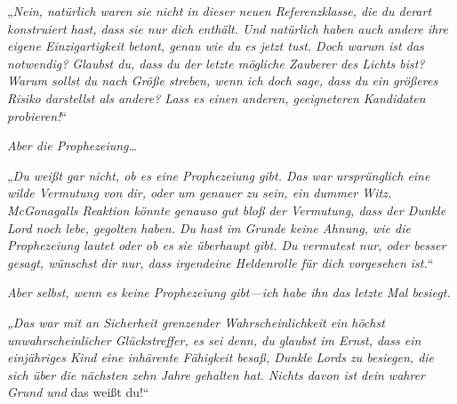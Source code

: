 „\emph{Nein, natürlich waren sie nicht in dieser neuen Referenzklasse, die du derart konstruiert hast, dass sie nur dich enthält. Und natürlich haben auch andere ihre eigene Einzigartigkeit betont, genau wie du es jetzt tust. Doch warum ist das notwendig? Glaubst du, dass du der letzte mögliche Zauberer des Lichts bist? Warum sollst \emph{du} nach Größe streben, wenn ich doch sage, dass du ein größeres Risiko darstellst als andere? Lass es einen anderen, geeigneteren Kandidaten probieren!}“

\emph{Aber die Prophezeiung…}

„\emph{Du weißt gar nicht, ob es eine Prophezeiung gibt. Das war ursprünglich eine wilde Vermutung von dir, oder um genauer zu sein, ein dummer Witz. McGonagalls Reaktion könnte genauso gut bloß der Vermutung, dass der Dunkle Lord noch lebe, gegolten haben. Du hast im Grunde keine Ahnung, wie die Prophezeiung lautet oder ob es sie überhaupt \emph{gibt}. Du vermutest nur, oder besser gesagt, \emph{wünschst} dir nur, dass irgendeine Heldenrolle für dich vorgesehen ist.}“

\emph{Aber selbst, wenn es keine Prophezeiung gibt—ich habe ihn das letzte Mal besiegt. }

\emph{„Das war mit an Sicherheit grenzender Wahrscheinlichkeit ein höchst unwahrscheinlicher Glückstreffer, es sei denn, du glaubst im Ernst, dass ein einjähriges Kind eine inhärente Fähigkeit besaß, Dunkle Lords zu besiegen, die sich über die nächsten zehn Jahre gehalten hat. Nichts davon ist dein wahrer Grund und} das weißt du!“

